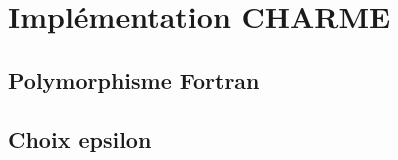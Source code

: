   \section{Implémentation CHARME}

    \subsection{Polymorphisme Fortran}

    \subsection{Choix epsilon}
